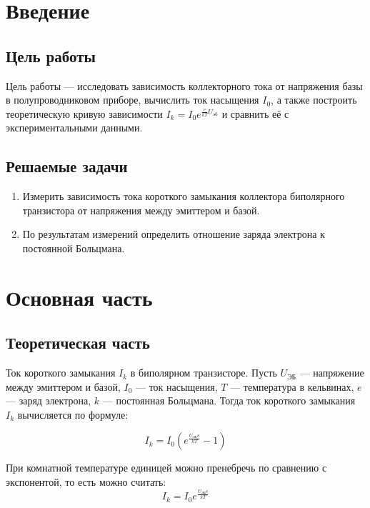 \section{Введение}
\subsection{Цель работы}
Цель работы — исследовать зависимость коллекторного тока от напряжения базы в полупроводниковом приборе, вычислить ток насыщения \( I_0 \), а также построить теоретическую кривую зависимости \( I_k = I_0 e^{\frac{e}{kT} U_{\text{эб}}} \) и сравнить её с экспериментальными данными.

\subsection{Решаемые задачи}
\begin{enumerate}
\item Измерить зависимость тока короткого замыкания коллектора биполярного
транзистора от напряжения между эмиттером и базой.
\item По результатам измерений определить отношение заряда электрона к
постоянной Больцмана.
\end{enumerate}

\section{Основная часть}

\subsection{Теоретическая часть}
Ток короткого замыкания $I_k$ в биполярном транзисторе. Пусть \( U_{\text{ЭБ}} \) — напряжение между эмиттером и базой, \( I_0 \) — ток насыщения, \( T \) — температура в кельвинах, \( e \) — заряд электрона, \( k \) — постоянная Больцмана. Тогда ток короткого замыкания \( I_k \) вычисляется по формуле:


\begin{equation}
I_k = I_0 \left( e^{\frac{U_{\text{ЭБ}} e}{kT}} - 1 \right)
\end{equation}


При комнатной температуре единицей можно пренебречь по сравнению с экспонентой, то есть можно считать:
\begin{equation}
I_k = I_0 e^{\frac{U_{\text{ЭБ}} e}{kT}}
\end{equation}

